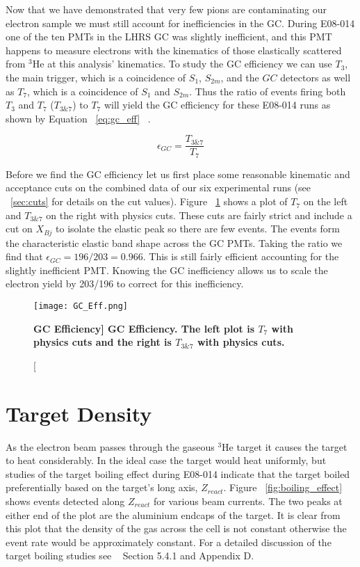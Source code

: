 Now that we have demonstrated that very few pions are contaminating our electron sample we must still account for inefficiencies in the GC. During E08-014 one of the ten PMTs in the LHRS GC was slightly inefficient, and this PMT happens to measure electrons with the kinematics of those elastically scattered from $^3$He at this analysis' kinematics. To study the GC efficiency we can use $T_3$, the main trigger, which is a coincidence of $S_1$, $S_{2m}$, and the $GC$ detectors as well as $T_7$, which is a coincidence of $S_1$ and $S_{2m}$. Thus the ratio of events firing both $T_3$ and $T_7$ ($T_{3\&7}$) to $T_7$ will yield the GC efficiency for these E08-014 runs as shown by Equation ~\ref{eq:gc_eff} ~\cite{dien_gc}. 

\begin{equation} \label{eq:gc_eff}
	\epsilon_{GC} = \frac{T_{3\&7}}{T_7}
\end{equation}

Before we find the GC efficiency let us first place some reasonable kinematic and acceptance cuts on the combined data of our six experimental runs (see ~\ref{sec:cuts} for details on the cut values). Figure ~\ref{fig:gc_eff} shows a plot of $T_7$ on the left and $T_{3\&7}$ on the right with physics cuts. These cuts are fairly strict and include a cut on $X_{Bj}$ to isolate the elastic peak so there are few events. The events form the characteristic elastic band shape across the GC PMTs. Taking the ratio we find that $\epsilon_{GC} = 196/203 = 0.966$. This is still fairly efficient accounting for the slightly inefficient PMT. Knowing the GC inefficiency allows us to scale the electron yield by 203/196 to correct for this inefficiency.

\begin{figure}[!ht]
\begin{center}
\texttt{[image: GC\_Eff.png]}
\end{center}
\caption[\bf{GC Efficiency}]{
{\bf{GC Efficiency.}} The left plot is $T_7$ with physics cuts and the right is $T_{3\&7}$ with physics cuts.}
\label{fig:gc_eff}
\end{figure}

\section{Target Density}
\label{sec:density}

As the electron beam passes through the gaseous $^3$He target it causes the target to heat considerably. In the ideal case the target would heat uniformly, but studies of the target boiling effect during E08-014 indicate that the target boiled preferentially based on the target's long axis, $Z_{react}$. Figure ~\ref{fig:boiling_effect} shows events detected along $Z_{react}$ for various beam currents. The two peaks at either end of the plot are the aluminium endcaps of the target. It is clear from this plot that the density of the gas across the cell is not constant otherwise the event rate would be approximately constant. For a detailed discussion of the target boiling studies see ~\cite{Thesis:Ye} Section 5.4.1 and Appendix D. 

